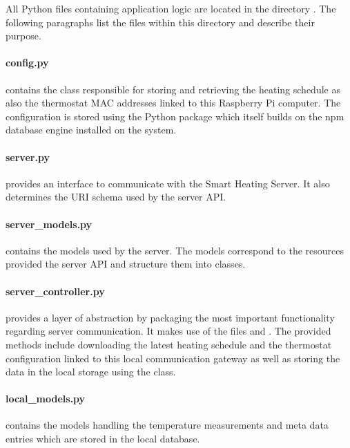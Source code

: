 All Python files containing application logic are located in the directory .
The following paragraphs list the files within this directory and describe their purpose.


\paragraph{config.py} contains the  class responsible for storing and retrieving the heating schedule as also the thermostat MAC addresses linked to this Raspberry Pi computer.
The configuration is stored using the  Python package which itself builds on the npm database engine installed on the system.

\paragraph{server.py} provides an interface to communicate with the Smart Heating Server.
It also determines the URI schema used by the server API.

\paragraph{server\_models.py} contains the models used by the server.
The models correspond to the resources provided the server API and structure them into classes.

\paragraph{server\_controller.py} provides a layer of abstraction by packaging the most important functionality regarding server communication.
It makes use of the files  and .
The provided methods include downloading the latest heating schedule and the thermostat configuration linked to this local communication gateway as well as storing the data in the local storage using the  class.

\paragraph{local\_models.py} contains the models handling the temperature measurements and meta data entries which are stored in the local database.

